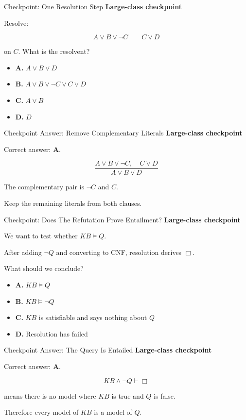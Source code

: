 \documentclass[aspectratio=169,11pt]{beamer}
\newcommand{\activity}{\textbf{\color{unsworange}Large-class checkpoint}}
\newcommand{\choice}[2]{\textbf{#1.} #2}
\begin{document}
\begin{frame}{Checkpoint: One Resolution Step}
  \activity

  \vspace{0.4em}
  Resolve:

  \[
    A \lor B \lor \neg C
    \qquad
    C \lor D
  \]

  on $C$. What is the resolvent?

  \begin{itemize}
    \item \choice{A}{$A \lor B \lor D$}
    \item \choice{B}{$A \lor B \lor \neg C \lor C \lor D$}
    \item \choice{C}{$A \lor B$}
    \item \choice{D}{$D$}
  \end{itemize}
\end{frame}

\begin{frame}{Checkpoint Answer: Remove Complementary Literals}
  \activity

  Correct answer: \textbf{A}.

  \[
    \frac{A \lor B \lor \neg C,\quad C \lor D}{A \lor B \lor D}
  \]

  The complementary pair is $\neg C$ and $C$.

  Keep the remaining literals from both clauses.
\end{frame}

\begin{frame}{Checkpoint: Does The Refutation Prove Entailment?}
  \activity

  \vspace{0.4em}
  We want to test whether $KB \models Q$.

  After adding $\neg Q$ and converting to CNF, resolution derives $\Box$.

  What should we conclude?

  \begin{itemize}
    \item \choice{A}{$KB \models Q$}
    \item \choice{B}{$KB \models \neg Q$}
    \item \choice{C}{$KB$ is satisfiable and says nothing about $Q$}
    \item \choice{D}{Resolution has failed}
  \end{itemize}
\end{frame}

\begin{frame}{Checkpoint Answer: The Query Is Entailed}
  \activity

  Correct answer: \textbf{A}.

  \[
    KB \land \neg Q \vdash \Box
  \]

  means there is no model where $KB$ is true and $Q$ is false.

  Therefore every model of $KB$ is a model of $Q$.
\end{frame}
\end{document}
